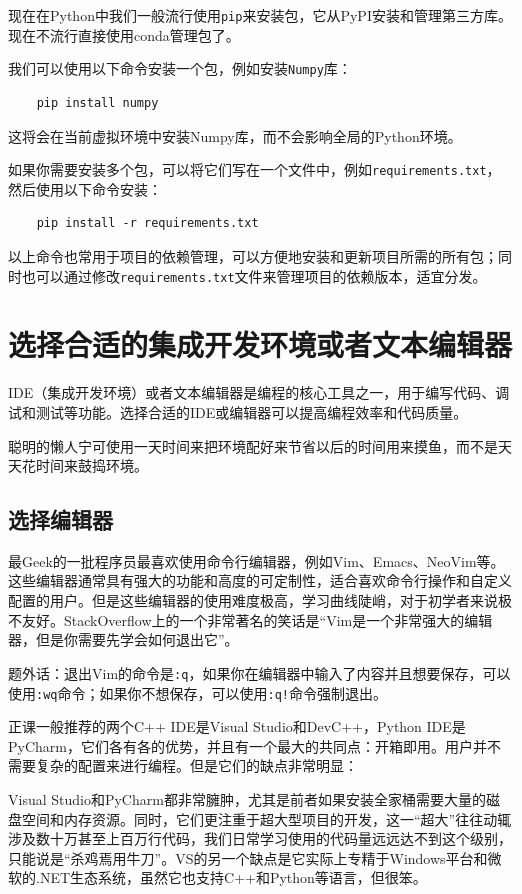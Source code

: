 \documentclass[../main.tex]{subfiles}
\begin{document}
现在在Python中我们一般流行使用\texttt{pip}来安装包，它从PyPI安装和管理第三方库。现在不流行直接使用conda管理包了。

我们可以使用以下命令安装一个包，例如安装\texttt{Numpy}库：
\begin{verbatim}
    pip install numpy
\end{verbatim}
这将会在当前虚拟环境中安装Numpy库，而不会影响全局的Python环境。

如果你需要安装多个包，可以将它们写在一个文件中，例如\texttt{requirements.txt}，然后使用以下命令安装：
\begin{verbatim}
    pip install -r requirements.txt
\end{verbatim}
以上命令也常用于项目的依赖管理，可以方便地安装和更新项目所需的所有包；同时也可以通过修改\texttt{requirements.txt}文件来管理项目的依赖版本，适宜分发。

\section{选择合适的集成开发环境或者文本编辑器}

IDE（集成开发环境）或者文本编辑器是编程的核心工具之一，用于编写代码、调试和测试等功能。选择合适的IDE或编辑器可以提高编程效率和代码质量。

聪明的懒人宁可使用一天时间来把环境配好来节省以后的时间用来摸鱼，而不是天天花时间来鼓捣环境。

\subsection{选择编辑器}

最Geek的一批程序员最喜欢使用命令行编辑器，例如Vim、Emacs、NeoVim等。这些编辑器通常具有强大的功能和高度的可定制性，适合喜欢命令行操作和自定义配置的用户。但是这些编辑器的使用难度极高，学习曲线陡峭，对于初学者来说极不友好。StackOverflow上的一个非常著名的笑话是“Vim是一个非常强大的编辑器，但是你需要先学会如何退出它”。

题外话：退出Vim的命令是\texttt{:q}，如果你在编辑器中输入了内容并且想要保存，可以使用\texttt{:wq}命令；如果你不想保存，可以使用\texttt{:q!}命令强制退出。

正课一般推荐的两个C++ IDE是Visual Studio和DevC++，Python IDE是PyCharm，它们各有各的优势，并且有一个最大的共同点：开箱即用。用户并不需要复杂的配置来进行编程。但是它们的缺点非常明显：

Visual Studio和PyCharm都非常臃肿，尤其是前者如果安装全家桶需要大量的磁盘空间和内存资源。同时，它们更注重于超大型项目的开发，这一“超大”往往动辄涉及数十万甚至上百万行代码，我们日常学习使用的代码量远远达不到这个级别，只能说是“杀鸡焉用牛刀”。VS的另一个缺点是它实际上专精于Windows平台和微软的.NET生态系统，虽然它也支持C++和Python等语言，但很笨。
\end{document}
